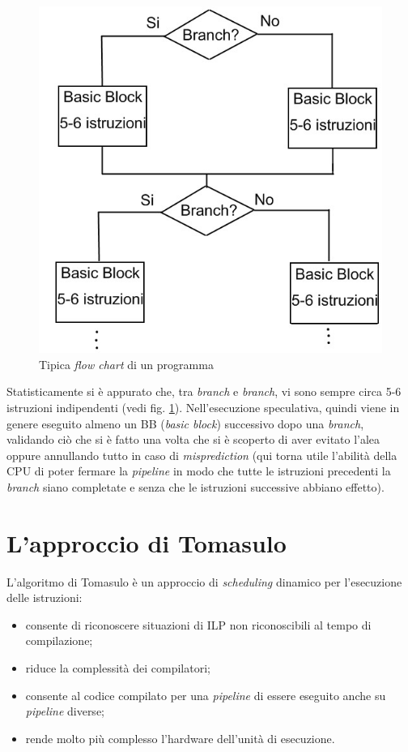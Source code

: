 \begin{figure}[!h]
\centering
\includegraphics[width=0.5\columnwidth]{img/flowChartTipo}
\caption{Tipica \textit{flow chart} di un programma}
\label{fig:flowChartTipo}
\end{figure}

Statisticamente si è appurato che, tra \textit{branch} e \textit{branch}, vi sono sempre circa 5-6 istruzioni indipendenti (vedi fig. \ref{fig:flowChartTipo}). Nell'esecuzione speculativa, quindi viene in genere eseguito almeno un BB (\textit{basic block}) successivo dopo una \textit{branch}, validando ciò che si è fatto una volta che si è scoperto di aver evitato l'alea oppure annullando tutto in caso di \textit{misprediction} (qui torna utile l'abilità della CPU di poter fermare la \textit{pipeline} in modo che tutte le istruzioni precedenti la \textit{branch} siano completate e senza che le istruzioni successive abbiano effetto).

\section{L'approccio di Tomasulo}
\label{sec:tomasulo}

L'algoritmo di Tomasulo è un approccio di \textit{scheduling} dinamico per l'esecuzione delle istruzioni:
\begin{itemize}
\item consente di riconoscere situazioni di ILP non riconoscibili al tempo di compilazione;
\item riduce la complessità dei compilatori;
\item consente al codice compilato per una \textit{pipeline} di essere eseguito anche su \textit{pipeline} diverse;
\item rende molto più complesso l'hardware dell'unità di esecuzione.
\end{itemize}

